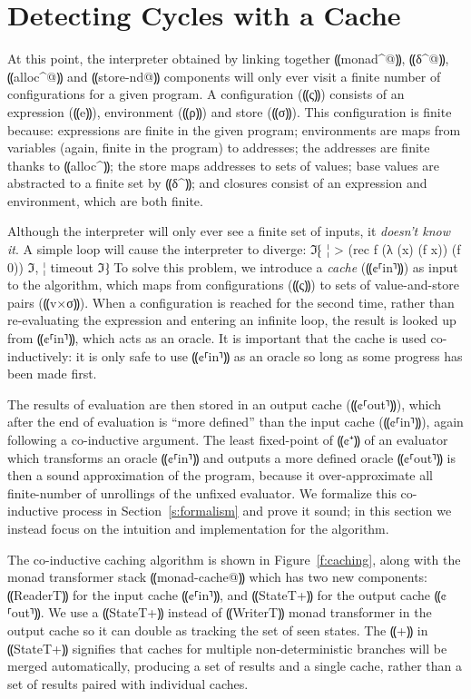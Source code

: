 \section{Detecting Cycles with a Cache}\label{s:cache}

At this point, the interpreter obtained by linking together ⸨monad^@⸩, ⸨δ^@⸩,
⸨alloc^@⸩ and ⸨store-nd@⸩ components will only ever visit a finite number of
configurations for a given program. A configuration (⸨ς⸩) consists of an
expression (⸨e⸩), environment (⸨ρ⸩) and store (⸨σ⸩). This configuration is
finite because: expressions are finite in the given program; environments are
maps from variables (again, finite in the program) to addresses; the addresses
are finite thanks to ⸨alloc^⸩; the store maps addresses to sets of values; base
values are abstracted to a finite set by ⸨δ^⸩; and closures consist of an
expression and environment, which are both finite.

Although the interpreter will only ever see a finite set of inputs, it
\emph{doesn't know it}.  A simple loop will cause the interpreter to diverge:
ℑ⁅
¦ > (rec f (λ (x) (f x)) (f 0))
ℑ,
¦ timeout
ℑ⁆
To solve this problem, we introduce a \emph{cache} (⸨¢⸢in⸣⸩) as input to the
algorithm, which maps from configurations (⸨ς⸩) to sets of value-and-store
pairs (⸨v×σ⸩). When a configuration is reached for the second time, rather than
re-evaluating the expression and entering an infinite loop, the result is
looked up from ⸨¢⸢in⸣⸩, which acts as an oracle. It is important that the cache
is used co-inductively: it is only safe to use ⸨¢⸢in⸣⸩ as an oracle so long as
some progress has been made first. 

The results of evaluation are then stored in an output cache (⸨¢⸢out⸣⸩), which
after the end of evaluation is “more defined” than the input cache (⸨¢⸢in⸣⸩),
again following a co-inductive argument. The least fixed-point of ⸨¢⁺⸩ of an
evaluator which transforms an oracle ⸨¢⸢in⸣⸩ and outputs a more defined oracle
⸨¢⸢out⸣⸩ is then a sound approximation of the program, because it
over-approximate all finite-number of unrollings of the unfixed evaluator. We
formalize this co-inductive process in Section~\ref{s:formalism} and prove it
sound; in this section we instead focus on the intuition and implementation for
the algorithm.

The co-inductive caching algorithm is shown in Figure~\ref{f:caching}, along
with the monad transformer stack ⸨monad-cache@⸩ which has two new components:
⸨ReaderT⸩ for the input cache ⸨¢⸢in⸣⸩, and ⸨StateT+⸩ for the output cache
⸨¢⸢out⸣⸩. We use a ⸨StateT+⸩ instead of ⸨WriterT⸩ monad transformer in the
output cache so it can double as tracking the set of seen states. The ⸨+⸩ in
⸨StateT+⸩ signifies that caches for multiple non-deterministic branches will be
merged automatically, producing a set of results and a single cache, rather
than a set of results paired with individual caches.

